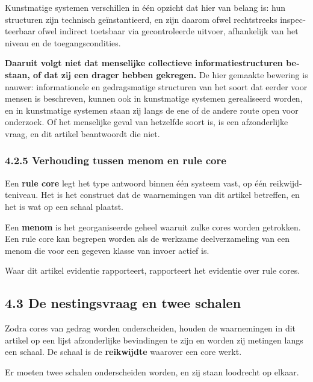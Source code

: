 \begin{dutch}
Kunstmatige systemen verschillen in één opzicht dat hier van belang is: hun structuren zijn technisch geïnstantieerd, en zijn daarom ofwel rechtstreeks inspecteerbaar ofwel indirect toetsbaar via gecontroleerde uitvoer, afhankelijk van het niveau en de toegangscondities.

\textbf{Daaruit volgt niet dat menselijke collectieve informatiestructuren bestaan, of dat zij een drager hebben gekregen.} De hier gemaakte bewering is nauwer: informationele en gedragsmatige structuren van het soort dat eerder voor mensen is beschreven, kunnen ook in kunstmatige systemen gerealiseerd worden, en in kunstmatige systemen staan zij langs de ene of de andere route open voor onderzoek. Of het menselijke geval van hetzelfde soort is, is een afzonderlijke vraag, en dit artikel beantwoordt die niet.


\subsubsection*{4.2.5 Verhouding tussen menom en rule core}
\label{sec:nl:4.2.5}

Een \textbf{rule core} legt het type antwoord binnen één systeem vast, op één reikwijdteniveau. Het is het construct dat de waarnemingen van dit artikel betreffen, en het is wat  op een schaal plaatst.

Een \textbf{menom} is het georganiseerde geheel waaruit zulke cores worden getrokken. Een rule core kan begrepen worden als de werkzame deelverzameling van een menom die voor een gegeven klasse van invoer actief is.

Waar dit artikel evidentie rapporteert, rapporteert het evidentie over rule cores.


\subsection*{4.3 De nestingsvraag en twee schalen}
\label{sec:nl:4.3}

Zodra cores van gedrag worden onderscheiden, houden de waarnemingen in dit artikel op een lijst afzonderlijke bevindingen te zijn en worden zij metingen langs een schaal. De schaal is de \textbf{reikwijdte} waarover een core werkt.

Er moeten twee schalen onderscheiden worden, en zij staan loodrecht op elkaar.


\end{dutch}

